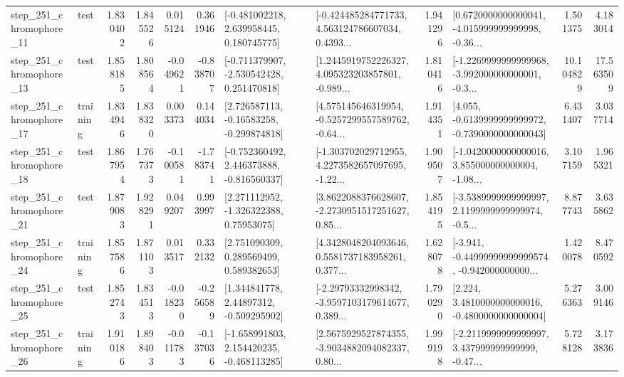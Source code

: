 \begin{tabular}{llrrrrllrlrr}
  step\_251\_chromophore\_11 &      test &      1.830402 &    1.845526 &      0.015124 &  0.361946 &    [-0.481002218, 2.639958445, 0.180745775] &  [-0.424485284771733, 4.563124786607034, 0.4393... &       1.941296 &  [0.6720000000000041, -4.015999999999998, -0.36... &            1.501375 &          4.183014 \\
  step\_251\_chromophore\_13 &      test &      1.858185 &    1.808564 &     -0.049621 & -0.838707 &   [-0.711379907, -2.530542428, 0.251470818] &  [1.2445919752226327, 4.095323203857801, -0.989... &       1.810416 &  [-1.2269999999999968, -3.992000000000001, -0.3... &           10.104829 &         17.563509 \\
  step\_251\_chromophore\_17 &  training &      1.834946 &    1.838320 &      0.003373 &  0.144034 &    [2.726587113, -0.16583258, -0.299874818] &  [4.575145646319954, -0.5257299557589762, -0.64... &       1.914351 &  [4.055, -0.6139999999999972, -0.7390000000000043] &            6.431407 &          3.037714 \\
  step\_251\_chromophore\_18 &      test &      1.867954 &    1.767373 &     -0.100581 & -1.783741 &   [-0.752360492, 2.446373888, -0.816560337] &  [-1.303702029712955, 4.2273582657097695, -1.22... &       1.909507 &  [-1.0420000000000016, 3.855000000000004, -1.08... &            3.107159 &          1.965321 \\
  step\_251\_chromophore\_21 &      test &      1.879083 &    1.928291 &      0.049207 &  0.993997 &     [2.271112952, -1.326322388, 0.75953075] &  [3.8622088376628607, -2.2730951517251627, 0.85... &       1.854195 &  [-3.5389999999999997, 2.1199999999999974, -0.5... &            8.877743 &          3.635862 \\
  step\_251\_chromophore\_24 &  training &      1.857586 &    1.871103 &      0.013517 &  0.332132 &     [2.751090309, 0.289569499, 0.589382653] &  [4.3428048204093646, 0.5581737183958261, 0.377... &       1.628078 &  [-3.941, -0.44999999999999574, -0.942000000000... &            1.420078 &          8.470592 \\
  step\_251\_chromophore\_25 &      test &      1.852743 &    1.834513 &     -0.018230 & -0.256589 &     [1.344841778, 2.44897312, -0.509295902] &  [-2.29793332998342, -3.9597103179614677, 0.389... &       1.790290 &   [2.224, 3.4810000000000016, -0.4800000000000004] &            5.276363 &          3.009146 \\
  step\_251\_chromophore\_26 &  training &      1.910186 &    1.898403 &     -0.011783 & -0.137036 &   [-1.658991803, 2.154420235, -0.468113285] &  [2.5675929527874355, -3.9034882094082337, 0.80... &       1.999198 &  [-2.2119999999999997, 3.437999999999999, -0.47... &            5.728128 &          3.173836 \\

\end{tabular}
